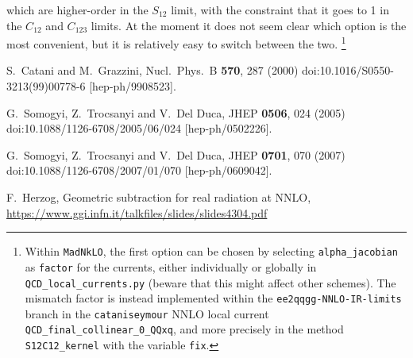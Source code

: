 \documentclass[11pt,a4paper]{article}
\newcommand{\mpd}[1]{\widehat{#1}}
\begin{document}
which are higher-order in the $S_{12}$ limit,
with the constraint that it goes to 1
in the $C_{12}$ and $C_{123}$ limits.
At the moment it does not seem clear which option
is the most convenient, but it is relatively easy
to switch between the two.%
\footnote{
Within \texttt{MadNkLO}, the first option can be chosen
by selecting \texttt{alpha\_jacobian} as \texttt{factor}
for the currents, either individually
or globally in \texttt{QCD\_local\_currents.py}
(beware that this might affect other schemes).
The mismatch factor is instead implemented
within the \texttt{ee2qqgg-NNLO-IR-limits} branch
in the \texttt{cataniseymour} NNLO local current
\texttt{QCD\_final\_collinear\_0\_QQxq},
and more precisely in the method \texttt{S12C12\_kernel}
with the variable \texttt{fix}.
}

\begin{comment}
A potential drawback of this choice is that
it makes the subtraction of disjoint collinear limits more complicated.
In fact, within the formula
\begin{equation}
	1
	- C_{12} - C_{34}
	+ C_{\mpd{3}\mpd{4}} C_{12} + C_{\mpd{1}\mpd{2}} C_{34}
	- C_{12;34},
\end{equation}
the last three terms, which all feature the same kinematics
thanks to the commutativity property of the rescaling mapping,
now differ \emph{only} because of jacobian factors.	
\end{comment}


\begin{thebibliography}{9}

  S.~Catani and M.~Grazzini,
  Nucl.\ Phys.\ B {\bf 570}, 287 (2000)
  doi:10.1016/S0550-3213(99)00778-6
  [hep-ph/9908523].

  G.~Somogyi, Z.~Trocsanyi and V.~Del Duca,
  JHEP {\bf 0506}, 024 (2005)
  doi:10.1088/1126-6708/2005/06/024
  [hep-ph/0502226].

  G.~Somogyi, Z.~Trocsanyi and V.~Del Duca,
  JHEP {\bf 0701}, 070 (2007)
  doi:10.1088/1126-6708/2007/01/070
  [hep-ph/0609042].
  
	F.~Herzog,
	Geometric subtraction for real radiation at NNLO,
	\url{https://www.ggi.infn.it/talkfiles/slides/slides4304.pdf}
 
\end{thebibliography}
\end{document}
